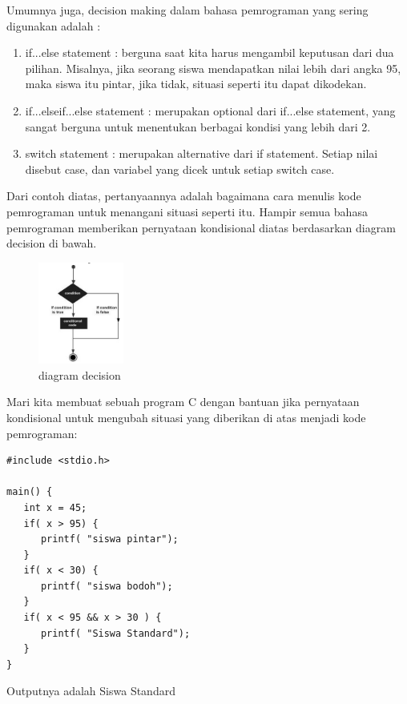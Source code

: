Umumnya juga, decision making dalam bahasa pemrograman yang sering digunakan adalah :
\begin{enumerate}
\item
if...else statement : berguna saat kita harus mengambil keputusan dari dua pilihan. Misalnya, jika seorang siswa mendapatkan nilai lebih dari angka 95, maka siswa itu pintar, jika tidak, situasi seperti itu dapat dikodekan. \par
\item
if...elseif...else statement : merupakan optional dari if...else statement, yang sangat berguna untuk menentukan berbagai kondisi yang lebih dari 2. \par
\item
switch statement : merupakan alternative dari if statement. Setiap nilai disebut case, dan variabel yang dicek untuk setiap switch case. \par
\end{enumerate}

Dari contoh diatas, pertanyaannya adalah bagaimana cara menulis kode pemrograman untuk menangani situasi seperti itu. Hampir semua bahasa pemrograman memberikan pernyataan kondisional diatas berdasarkan diagram decision di bawah. \par
\begin{figure}[ht]
	    \centerline{\includegraphics[width=0.25\textwidth]{figures/diagram_decision.png}}
	    \caption{diagram decision}
	    \label{diagram_decision}
	    \end{figure} \par

Mari kita membuat sebuah program C dengan bantuan jika pernyataan kondisional untuk mengubah situasi yang diberikan di atas menjadi kode pemrograman: \par 
\begin{verbatim}
#include <stdio.h>
 
main() {
   int x = 45;
   if( x > 95) {
      printf( "siswa pintar");
   }
   if( x < 30) {
      printf( "siswa bodoh");
   }
   if( x < 95 && x > 30 ) {
      printf( "Siswa Standard");
   }
}
\end{verbatim}\par
Outputnya adalah Siswa Standard

